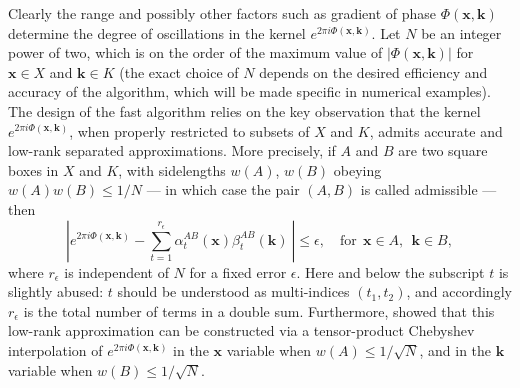 Clearly the range and possibly other factors such as gradient of phase $\Phi(\mathbf{x},\mathbf{k})$ determine the degree of oscillations in the kernel $e^{ 2\pi i\Phi(\mathbf{x},\mathbf{k})}$. Let $N$ be an integer power of two, which is on the order of the maximum value of $|\Phi(\mathbf{x},\mathbf{k})|$ for $\mathbf{x}\in X$ and $\mathbf{k}\in K$ (the exact choice of $N$ depends on the desired efficiency and accuracy of the algorithm, which will be made specific in numerical examples). The design of the fast algorithm relies on the key observation that the kernel $e^{ 2\pi i\Phi(\mathbf{x},\mathbf{k})}$, when properly restricted to subsets of $X$ and $K$, admits accurate and low-rank separated approximations. More precisely, if $A$ and $B$ are two square boxes in $X$ and $K$, with sidelengths $w(A)$, $w(B)$ obeying $w(A)w(B)\leq1/N$ --- in which case the pair $(A,B)$ is called admissible --- then
\begin{equation} \label{low-rank}
\left|e^{2\pi i \Phi(\mathbf{x},\mathbf{k})} -\sum_{t=1}^{r_\epsilon} 
\alpha_t^{AB}(\mathbf{x})\beta_t^{AB}(\mathbf{k})\ \right|\leq
\epsilon, \quad \text{for} \  \  \mathbf{x}\in
A, \ \ \mathbf{k}\in B,
\end{equation}
where $r_{\epsilon}$ is independent of $N$ for a fixed error $\epsilon$. Here and below the subscript $t$ is slightly abused: $t$ should be understood as multi-indices $(t_1,t_2)$, and accordingly $r_{\epsilon}$ is the total number of terms in a double sum. Furthermore, \cite{CDY09} showed that this low-rank approximation can be constructed via a tensor-product Chebyshev interpolation of $e^{2\pi i \Phi(\mathbf{x},\mathbf{k})}$ in the $\mathbf{x}$ variable when $w(A)\leq 1/\sqrt{N}$, and in the $\mathbf{k}$ variable when $w(B)\leq 1/\sqrt{N}$.  

